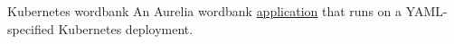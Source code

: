 \datedsubsectionnarrow{}
{Kubernetes wordbank}
{}
{ An Aurelia wordbank \href{https://github.com/JacobArchambault/aurelia-wordbank-with-kubernetes/}{application} that runs on a YAML-specified Kubernetes deployment.}
